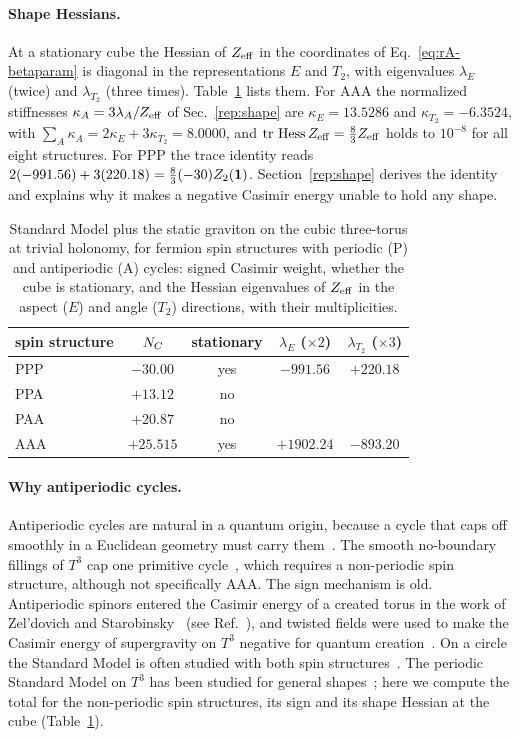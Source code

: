 \paragraph{Shape Hessians.}
At a stationary cube the Hessian of $Z_{\rm eff}$ in the coordinates of Eq.~\eqref{eq:rA-betaparam} is diagonal in the representations $E$ and $T_2$, with eigenvalues $\lambda_E$ (twice) and $\lambda_{T_2}$ (three times).
Table~\ref{tab:rA-spin} lists them.
For AAA the normalized stiffnesses $\kappa_A=3\lambda_A/Z_{\rm eff}$ of Sec.~\ref{rep:shape} are $\kappa_E=13.5286$ and $\kappa_{T_2}=-6.3524$, with $\sum_A\kappa_A=2\kappa_E+3\kappa_{T_2}=8.0000$, and $\operatorname{tr}\,{\rm Hess}\,Z_{\rm eff}=\tfrac83Z_{\rm eff}$ holds to $10^{-8}$ for all eight structures. %
For PPP the trace identity reads $2(-991.56)+3(220.18)=\tfrac83(-30)Z_2(\mathbf{1})$.
Section~\ref{rep:shape} derives the identity and explains why it makes a negative Casimir energy unable to hold any shape.

\begin{table}[tbp]
\centering
\caption{Standard Model plus the static graviton on the cubic three-torus at trivial holonomy, for fermion spin structures with periodic (P) and antiperiodic (A) cycles: signed Casimir weight, whether the cube is stationary, and the Hessian eigenvalues of $Z_{\rm eff}$ in the aspect ($E$) and angle ($T_2$) directions, with their multiplicities.}
\label{tab:rA-spin}
\begin{tabular}{lcccc}
\toprule
spin structure & $N_C$ & stationary & $\lambda_E$ ($\times2$) & $\lambda_{T_2}$ ($\times3$)\\
\midrule
PPP & $-30.00$ & yes & $-991.56$ & $+220.18$\\ %
PPA & $+13.12$ & no & & \\ %
PAA & $+20.87$ & no & & \\ %
AAA & $+25.515$ & yes & $+1902.24$ & $-893.20$\\ %
\bottomrule
\end{tabular}
\end{table}

\paragraph{Why antiperiodic cycles.}
Antiperiodic cycles are natural in a quantum origin, because a cycle that caps off smoothly in a Euclidean geometry must carry them~\cite{GarciaEtxebarria:2020xsr}.
The smooth no-boundary fillings of $T^3$ cap one primitive cycle~\cite{Godet:2026gqw}, which requires a non-periodic spin structure, although not specifically AAA.
The sign mechanism is old.
Antiperiodic spinors entered the Casimir energy of a created torus in the work of Zel'dovich and Starobinsky~\cite{Zeldovich:1984vk} (see Ref.~\cite{Guth:2025dal}), and twisted fields were used to make the Casimir energy of supergravity on $T^3$ negative for quantum creation~\cite{Goncharov:1985gi,Linde:2004nz}.
On a circle the Standard Model is often studied with both spin structures~\cite{Arkani-Hamed:2007ryu,Ibanez:2017kvh}.
The periodic Standard Model on $T^3$ has been studied for general shapes~\cite{Fornal:2011tw,Fornal:2026qfq}; here we compute the total for the non-periodic spin structures, its sign and its shape Hessian at the cube (Table~\ref{tab:rA-spin}).

